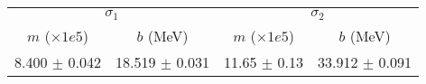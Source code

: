 \begin{tabular}{cc|cc}
\multicolumn{2}{c|}{$\sigma_1$} & \multicolumn{2}{|c}{$\sigma_2$} \\
$m$ ($\times1e5$) & $b$ (MeV) & $m$ ($\times1e5$) & $b$ (MeV) \\
\hline
8.400 $\pm$ 0.042 & 18.519 $\pm$ 0.031 & 11.65 $\pm$ 0.13 & 33.912 $\pm$ 0.091\\
\end{tabular}
